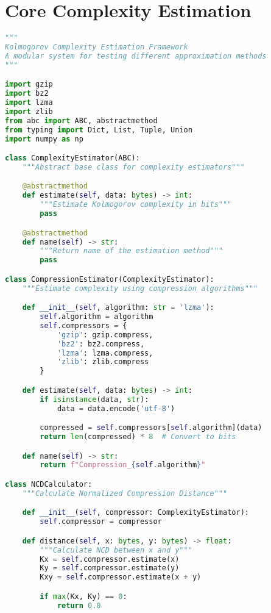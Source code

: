 \documentclass[12pt,a4paper]{report}
\begin{document}
\section{Core Complexity Estimation}

\begin{lstlisting}[language=Python, caption=Complexity Estimation Framework]
"""
Kolmogorov Complexity Estimation Framework
A modular system for testing different approximation methods
"""

import gzip
import bz2
import lzma
import zlib
from abc import ABC, abstractmethod
from typing import Dict, List, Tuple, Union
import numpy as np

class ComplexityEstimator(ABC):
    """Abstract base class for complexity estimators"""

    @abstractmethod
    def estimate(self, data: bytes) -> int:
        """Estimate Kolmogorov complexity in bits"""
        pass

    @abstractmethod
    def name(self) -> str:
        """Return name of the estimation method"""
        pass

class CompressionEstimator(ComplexityEstimator):
    """Estimate complexity using compression algorithms"""

    def __init__(self, algorithm: str = 'lzma'):
        self.algorithm = algorithm
        self.compressors = {
            'gzip': gzip.compress,
            'bz2': bz2.compress,
            'lzma': lzma.compress,
            'zlib': zlib.compress
        }

    def estimate(self, data: bytes) -> int:
        if isinstance(data, str):
            data = data.encode('utf-8')

        compressed = self.compressors[self.algorithm](data)
        return len(compressed) * 8  # Convert to bits

    def name(self) -> str:
        return f"Compression_{self.algorithm}"

class NCDCalculator:
    """Calculate Normalized Compression Distance"""

    def __init__(self, compressor: ComplexityEstimator):
        self.compressor = compressor

    def distance(self, x: bytes, y: bytes) -> float:
        """Calculate NCD between x and y"""
        Kx = self.compressor.estimate(x)
        Ky = self.compressor.estimate(y)
        Kxy = self.compressor.estimate(x + y)

        if max(Kx, Ky) == 0:
            return 0.0


\end{lstlisting}
\end{document}
